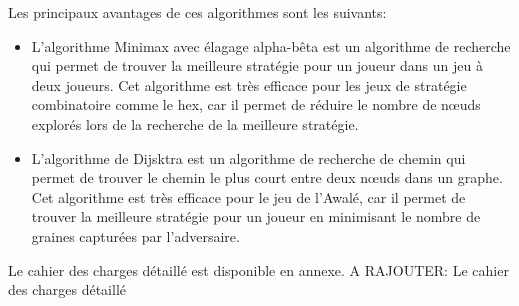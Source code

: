 Les principaux avantages de ces algorithmes sont les suivants:
\begin{itemize}
	\item L'algorithme Minimax avec élagage alpha-bêta est un algorithme de recherche
	qui permet de trouver la meilleure stratégie pour un joueur dans un jeu à deux
	joueurs. Cet algorithme est très efficace pour les jeux de stratégie combinatoire
	comme le hex, car il permet de réduire le nombre de nœuds explorés lors de la
	recherche de la meilleure stratégie.
	\item L'algorithme de Dijsktra est un algorithme de recherche de chemin qui permet
	de trouver le chemin le plus court entre deux nœuds dans un graphe. Cet algorithme
	est très efficace pour le jeu de l'Awalé, car il permet de trouver la meilleure
	stratégie pour un joueur en minimisant le nombre de graines capturées par l'adversaire.
\end{itemize}

Le cahier des charges détaillé est disponible en annexe.
A RAJOUTER\@: Le cahier des charges détaillé